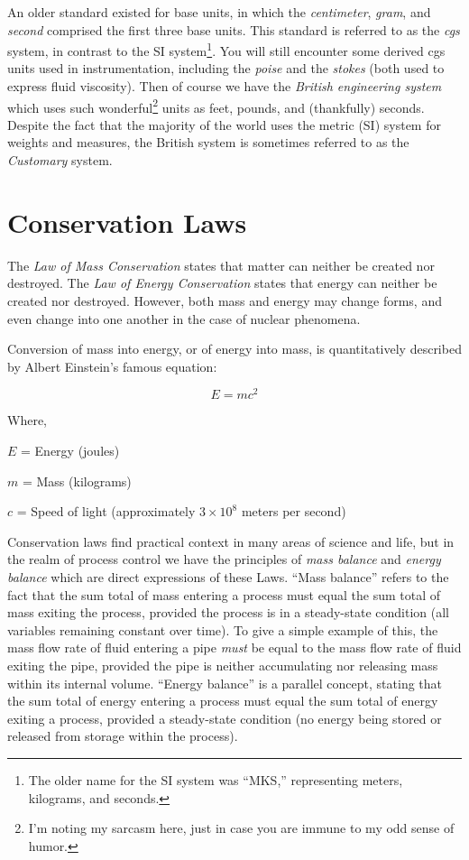 An older standard existed for base units, in which the \textit{centimeter}, \textit{gram}, and \textit{second} comprised the first three base units.  This standard is referred to as the \textit{cgs} system, in contrast to the SI system\footnote{The older name for the SI system was ``MKS,'' representing meters, kilograms, and seconds.}.  You will still encounter some derived cgs units used in instrumentation, including the \textit{poise} and the \textit{stokes} (both used to express fluid viscosity).  Then of course we have the \textit{British engineering system} which uses such wonderful\footnote{I'm noting my sarcasm here, just in case you are immune to my odd sense of humor.} units as feet, pounds, and (thankfully) seconds.  Despite the fact that the majority of the world uses the metric (SI) system for weights and measures, the British system is sometimes referred to as the \textit{Customary} system.  



\filbreak
\section{Conservation Laws}

The \textit{Law of Mass Conservation} states that matter can neither be created nor destroyed.  The \textit{Law of Energy Conservation} states that energy can neither be created nor destroyed.  However, both mass and energy may change forms, and even change into one another in the case of nuclear phenomena.    

Conversion of mass into energy, or of energy into mass, is quantitatively described by Albert Einstein's famous equation:  

$$E = mc^2$$

\noindent
Where,

$E$ = Energy (joules)

$m$ = Mass (kilograms)

$c$ = Speed of light (approximately $3 \times 10^8$ meters per second)

\vskip 10pt

Conservation laws find practical context in many areas of science and life, but in the realm of process control we have the principles of \textit{mass balance} and \textit{energy balance} which are direct expressions of these Laws.  ``Mass balance'' refers to the fact that the sum total of mass entering a process must equal the sum total of mass exiting the process, provided the process is in a steady-state condition (all variables remaining constant over time).  To give a simple example of this, the mass flow rate of fluid entering a pipe \textit{must} be equal to the mass flow rate of fluid exiting the pipe, provided the pipe is neither accumulating nor releasing mass within its internal volume.  ``Energy balance'' is a parallel concept, stating that the sum total of energy entering a process must equal the sum total of energy exiting a process, provided a steady-state condition (no energy being stored or released from storage within the process).    



